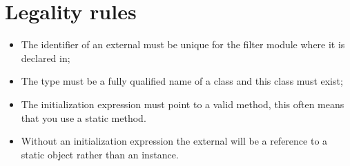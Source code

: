 \section{Legality rules}
\begin{itemize}[noitemsep]
\item The identifier of an external must be unique for the filter module where it is declared in;
\item The type must be a fully qualified name of a class and this class must exist;
\item The initialization expression must point to a valid method, this often means that you use a static method.
\item Without an initialization expression the external will be a reference to a static object rather than an instance.
\end{itemize}

\faq{}
\comments{}
\pending{}
